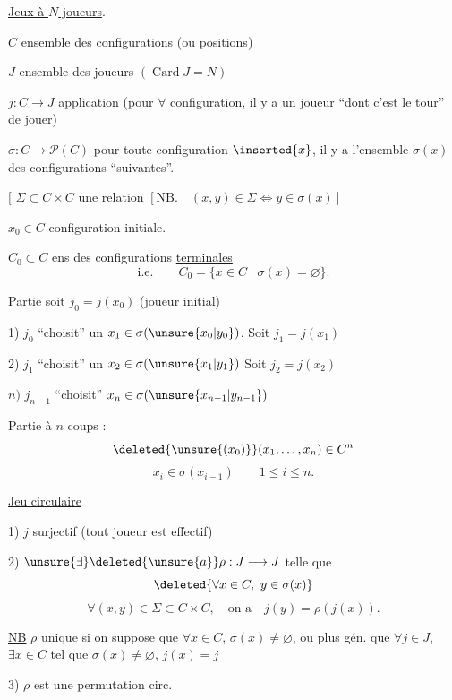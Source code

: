 \uline{Jeux à $N$ joueurs}.

$C$ ensemble des configurations (ou positions)

$J$ ensemble des joueurs $(\operatorname{Card}J=N)$

$j:C\longrightarrow J$ application (pour $\forall$ configuration, il y a un joueur ``dont c'est le tour'' de jouer)

$\sigma:C\longrightarrow\mathcal P(C)$ pour toute configuration $\inserted{x}$, il y a l'ensemble $\sigma(x)$ des configurations ``suivantes''.

$\bigl[$ $\Sigma\subset C\times C$ une relation $[\mathrm{NB}.\quad(x,y)\in\Sigma\Longleftrightarrow y\in\sigma(x)]$

$x_0\in C$ configuration initiale.

$C_0\subset C$ ens des configurations  \uline{terminales}
\[
\text{i.e.}\qquad C_0=\{x\in C\mid\sigma(x)=\varnothing\}.
\]

 \uline{Partie} soit $j_0=j(x_0)$ (joueur initial)

1) $j_0$ ``choisit'' un $x_1\in\sigma(\unsure{x_0|y_0})$. Soit $j_1=j(x_1)$

2) $j_1$ ``choisit'' un $x_2\in\sigma(\unsure{x_1|y_1})$ Soit $j_2=j(x_2)$


$n)$ $j_{n-1}$ ``choisit'' $x_n\in\sigma(\unsure{x_{n-1}|y_{n-1}})$

Partie à $n$ coups :
\[
\deleted{\unsure{(x_0)}}(x_1,\ldots,x_n)\in C^n
\]
\[
x_i\in\sigma(x_{i-1})\qquad 1\leq i\leq n.
\]

\uline{Jeu circulaire}

1) $j$ surjectif (tout joueur est effectif)

2) $\unsure{\exists}\deleted{\unsure{a}}\rho:J\longrightarrow J$ telle que
\[
\deleted{\forall x\in C,\ y\in\sigma(x)}
\]
\[
\forall(x,y)\in\Sigma\subset C\times C,\quad\text{on a}\quad j(y)=\rho(j(x)).
\]

\uline{NB} $\rho$ unique si on suppose que $\forall x\in C$,  $\sigma(x)\neq\varnothing$, ou plus gén. que $\forall j\in J$, $\exists x\in C$ tel que $\sigma(x)\neq\varnothing$, $j(x)=j$

3) $\rho$ est une permutation circ.
